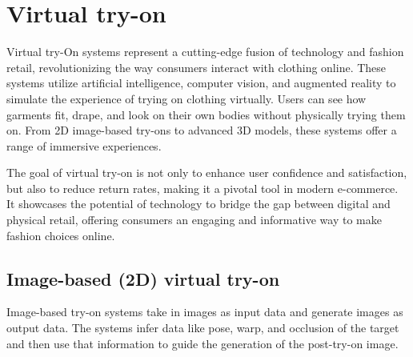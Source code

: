 \section{Virtual try-on} \label{section:vton}
	Virtual try-On systems represent a cutting-edge fusion of technology and fashion retail, revolutionizing the way consumers interact with clothing online. These systems utilize artificial intelligence, computer vision, and augmented reality to simulate the experience of trying on clothing virtually. Users can see how garments fit, drape, and look on their own bodies without physically trying them on. From 2D image-based try-ons to advanced 3D models, these systems offer a range of immersive experiences.
	
	The goal of virtual try-on is not only to enhance user confidence and satisfaction, but also to reduce return rates, making it a pivotal tool in modern e-commerce. It showcases the potential of technology to bridge the gap between digital and physical retail, offering consumers an engaging and informative way to make fashion choices online.

	\subsection{Image-based (2D) virtual try-on}
		Image-based try-on systems take in images as input data and generate images as output data. The systems infer data like pose, warp, and occlusion of the target and then use that information to guide the generation of the post-try-on image.



